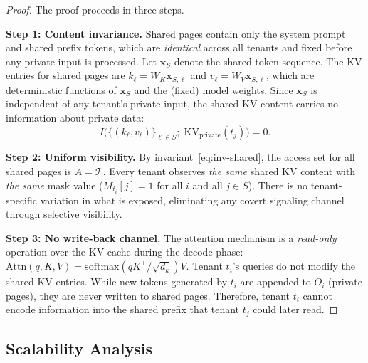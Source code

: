 \documentclass[11pt]{article}
\begin{document}
\begin{proof}
The proof proceeds in three steps.

\medskip
\noindent\textbf{Step 1: Content invariance.}
Shared pages contain only the system prompt and shared prefix tokens, which are
\emph{identical} across all tenants and fixed before any private input is processed.
Let $\mathbf{x}_S$ denote the shared token sequence. The KV entries for shared pages are
$k_\ell = W_K \mathbf{x}_{S,\ell}$ and $v_\ell = W_V \mathbf{x}_{S,\ell}$, which are
deterministic functions of $\mathbf{x}_S$ and the (fixed) model weights. Since
$\mathbf{x}_S$ is independent of any tenant's private input, the shared KV content carries
no information about private data:
\begin{equation}
    I\!\big(\{(k_\ell, v_\ell)\}_{\ell \in S};\; \mathrm{KV}_{\mathrm{private}}(t_j)\big) = 0.
\end{equation}

\medskip
\noindent\textbf{Step 2: Uniform visibility.}
By invariant~\eqref{eq:inv-shared}, the access set for all shared pages is
$A = \mathcal{T}$. Every tenant observes \emph{the same} shared KV content with
\emph{the same} mask value ($M_{t_i}[j] = 1$ for all $i$ and all $j \in S$). There is no
tenant-specific variation in what is exposed, eliminating any covert signaling channel
through selective visibility.

\medskip
\noindent\textbf{Step 3: No write-back channel.}
The attention mechanism is a \emph{read-only} operation over the KV cache during the
decode phase: $\mathrm{Attn}(q, K, V) = \mathrm{softmax}(qK^\top/\sqrt{d_k})V$.
Tenant $t_i$'s queries do not modify the shared KV entries. While new tokens generated by
$t_i$ are appended to $O_i$ (private pages), they are never written to shared pages.
Therefore, tenant $t_i$ cannot encode information into the shared prefix that tenant $t_j$
could later read.
\end{proof}

\subsection{Scalability Analysis}
\label{sec:formal:scalability}
\end{document}
